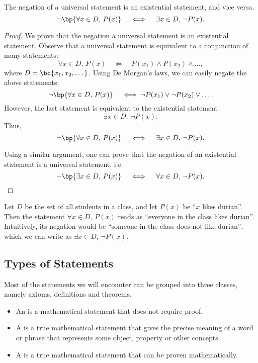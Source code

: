\begin{proposition}
    The negation of a universal statement is an existential statement, and vice versa. \[\lnot \bp{\forall x \in D, \, P(x)} \quad \iff \quad \exists x \in D, \, \lnot P(x).\]
\end{proposition}
\begin{proof}
    We prove that the negation a universal statement is an existential statement. Observe that a universal statement is equivalent to a conjunction of many statements: \[\forall x \in D, \, P(x) \quad \iff \quad P(x_1) \land P(x_2) \land \dots,\] where $D = \bc{x_1, x_2, \dots}$. Using De Morgan's laws, we can easily negate the above statements: \[\lnot \bp{\forall x \in D, \, P(x)} \quad \iff \lnot P(x_1) \lor \lnot P(x_2) \lor \dots.\] However, the last statement is equivalent to the existential statement \[\exists x \in D, \, \lnot P(x).\] Thus, \[\lnot \bp{\forall x \in D, \, P(x)} \quad \iff \quad \exists x \in D, \, \lnot P(x).\]

    Using a similar argument, one can prove that the negation of an existential statement is a universal statement, i.e. \[\lnot \bp{\exists x \in D, \, P(x)} \quad \iff \quad \forall x \in D, \, \lnot P(x).\]
\end{proof}

\begin{example}
    Let $D$ be the set of all students in a class, and let $P(x)$ be ``$x$ likes durian''. Then the statement $\forall x \in D, \, P(x)$ reads as ``everyone in the class likes durian''. Intuitively, its negation would be ``someone in the class does not like durian'', which we can write as $\exists x \in D, \, \lnot P(x)$.
\end{example}

\subsection{Types of Statements}

Most of the statements we will encounter can be grouped into three classes, namely axioms, definitions and theorems.

\begin{definition}
    \phantom{.}
    \begin{itemize}
        \item An  is a mathematical statement that does not require proof.
        \item A  is a true mathematical statement that gives the precise meaning of a word or phrase that represents some object, property or other concepts.
        \item A  is a true mathematical statement that can be proven mathematically.
    \end{itemize}
\end{definition}

